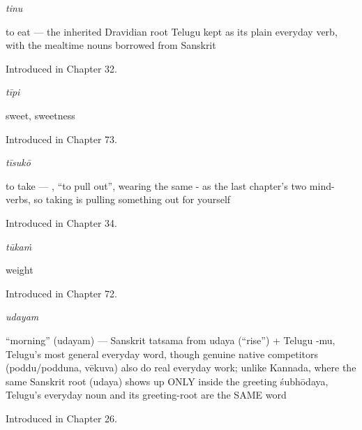 \noindent\begin{minipage}[t]{\linewidth}
\raggedright
\textbf{}\enspace\emph{tinu}\par
\small to eat — the inherited Dravidian root Telugu kept as its plain everyday verb, with the mealtime nouns borrowed from Sanskrit\par
\footnotesize Introduced in Chapter 32.
\end{minipage}\par\medskip

\noindent\begin{minipage}[t]{\linewidth}
\raggedright
\textbf{}\enspace\emph{tīpi}\par
\small sweet, sweetness\par
\footnotesize Introduced in Chapter 73.
\end{minipage}\par\medskip

\noindent\begin{minipage}[t]{\linewidth}
\raggedright
\textbf{}\enspace\emph{tīsukō}\par
\small to take — , \textquotedblleft{}to pull out\textquotedblright{}, wearing the same - as the last chapter's two mind-verbs, so taking is pulling something out for yourself\par
\footnotesize Introduced in Chapter 34.
\end{minipage}\par\medskip

\noindent\begin{minipage}[t]{\linewidth}
\raggedright
\textbf{}\enspace\emph{tūkaṁ}\par
\small weight\par
\footnotesize Introduced in Chapter 72.
\end{minipage}\par\medskip

\noindent\begin{minipage}[t]{\linewidth}
\raggedright
\textbf{}\enspace\emph{udayam}\par
\small \textquotedblleft{}morning\textquotedblright{} (udayam) — Sanskrit tatsama from udaya (\textquotedblleft{}rise\textquotedblright{}) + Telugu -mu, Telugu's most general everyday word, though genuine native competitors (poddu/podduna, vēkuva) also do real everyday work; unlike Kannada, where the same Sanskrit root (udaya) shows up ONLY inside the greeting śubhōdaya, Telugu's everyday noun and its greeting-root are the SAME word\par
\footnotesize Introduced in Chapter 26.
\end{minipage}\par\medskip

